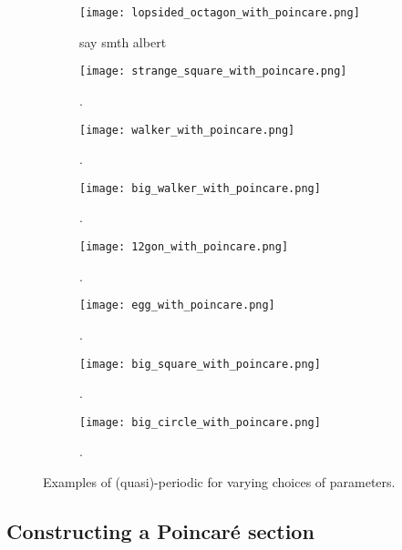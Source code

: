 \begin{figure}[!th]
\ContinuedFloat
\centering
\begin{subfigure}{0.49\textwidth}
\centering
\texttt{[image: lopsided\_octagon\_with\_poincare.png]}
\caption{say smth albert}
\label{subfig:periodicorbit11}
\end{subfigure}
%
\begin{subfigure}{0.49\textwidth}
\texttt{[image: strange\_square\_with\_poincare.png]}
\caption{.}
\label{subfig:periodicorbit12}
\end{subfigure}
%
\begin{subfigure}{0.49\textwidth}
\texttt{[image: walker\_with\_poincare.png]}
\caption{.}
\label{subfig:periodicorbit13}
\end{subfigure}
%
\begin{subfigure}{0.49\textwidth}
\texttt{[image: big\_walker\_with\_poincare.png]}
\caption{.}
\label{subfig:periodicorbit14}
\end{subfigure}
%
\begin{subfigure}{0.49\textwidth}
\texttt{[image: 12gon\_with\_poincare.png]}
\caption{.}
\label{subfig:periodicorbit15}
\end{subfigure}
%
\begin{subfigure}{0.49\textwidth}
\texttt{[image: egg\_with\_poincare.png]}
\caption{.}
\label{subfig:periodicorbit16}
\end{subfigure}
%
\begin{subfigure}{0.49\textwidth}
\texttt{[image: big\_square\_with\_poincare.png]}
\caption{.}
\label{subfig:periodicorbit17}
\end{subfigure}
%
\begin{subfigure}{0.49\textwidth}
\texttt{[image: big\_circle\_with\_poincare.png]}
\caption{.}
\label{subfig:periodicorbit18}
\end{subfigure}
\caption{Examples of (quasi)-periodic for varying choices of parameters.}
\label{fig:periodicorbits1}
\end{figure}

\subsection{Constructing a Poincar\'e section}

